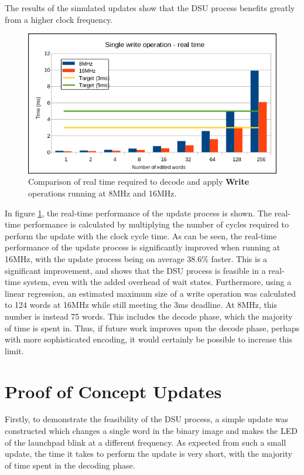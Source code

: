 The results of the simulated updates show that the DSU process benefits greatly from a higher clock frequency. 
\begin{figure}[!ht]
    \begin{shaded}
        \centering
        \includegraphics[width=\figurewidth]{img/W8vs16_rt.png}
        \caption{Comparison of real time required to decode and apply \textbf{Write} operations running at 8MHz and 16MHz.}
        \label{fig:s8vs16}
    \end{shaded}
\end{figure}

In figure \ref{fig:s8vs16}, the real-time performance of the update process is shown. The real-time performance is calculated by multiplying the number of cycles required to perform the update with the clock cycle time. As can be seen, the real-time performance of the update process is significantly improved when running at 16MHz, with the update process being on average $38.6\%$ faster. This is a significant improvement, and shows that the DSU process is feasible in a real-time system, even with the added overhead of wait states. Furthermore, using a linear regression, an estimated maximum size of a write operation was calculated to 124 words at 16MHz while still meeting the 3ms deadline. At 8MHz, this number is instead 75 words. This includes the decode phase, which the majority of time is spent in. Thus, if future work improves upon the decode phase, perhaps with more sophisticated encoding, it would certainly be possible to increase this limit.

\section{Proof of Concept Updates}
Firstly, to demonstrate the feasibility of the DSU process, a simple update was constructed which changes a single word in the binary image and makes the LED of the launchpad blink at a different frequency. 
As expected from such a small update, the time it takes to perform the update is very short, with the majority of time spent in the decoding phase. 


